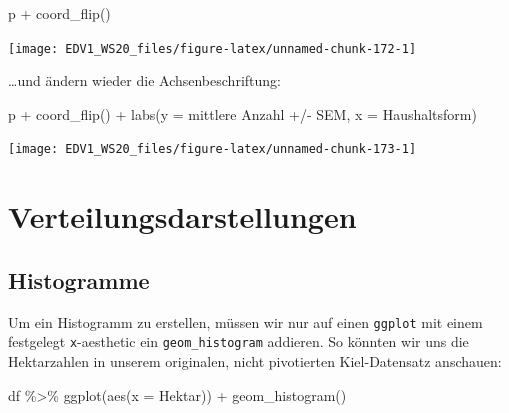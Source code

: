 \documentclass[
]{book}
\newenvironment{Shaded}{\begin{snugshade}}{\end{snugshade}}
\newcommand{\AttributeTok}[1]{\textcolor[rgb]{0.77,0.63,0.00}{#1}}
\newcommand{\FunctionTok}[1]{\textcolor[rgb]{0.00,0.00,0.00}{#1}}
\newcommand{\NormalTok}[1]{#1}
\newcommand{\SpecialCharTok}[1]{\textcolor[rgb]{0.00,0.00,0.00}{#1}}
\newcommand{\StringTok}[1]{\textcolor[rgb]{0.31,0.60,0.02}{#1}}
\begin{document}
\begin{Shaded}
\begin{Highlighting}[]
\NormalTok{p }\SpecialCharTok{+} \FunctionTok{coord\_flip}\NormalTok{()}
\end{Highlighting}
\end{Shaded}

\begin{center}\texttt{[image: EDV1\_WS20\_files/figure-latex/unnamed-chunk-172-1]} \end{center}

\ldots und ändern wieder die Achsenbeschriftung:

\begin{Shaded}
\begin{Highlighting}[]
\NormalTok{p }\SpecialCharTok{+} \FunctionTok{coord\_flip}\NormalTok{() }\SpecialCharTok{+}
  \FunctionTok{labs}\NormalTok{(}\AttributeTok{y =} \StringTok{\textquotesingle{}mittlere Anzahl +/{-} SEM\textquotesingle{}}\NormalTok{,}
       \AttributeTok{x =} \StringTok{\textquotesingle{}Haushaltsform\textquotesingle{}}\NormalTok{)}
\end{Highlighting}
\end{Shaded}

\begin{center}\texttt{[image: EDV1\_WS20\_files/figure-latex/unnamed-chunk-173-1]} \end{center}

\hypertarget{verteilungsdarstellungen}{%
\section{Verteilungsdarstellungen}\label{verteilungsdarstellungen}}

\hypertarget{histogramme}{%
\subsection{Histogramme}\label{histogramme}}

Um ein Histogramm zu erstellen, müssen wir nur auf einen \texttt{ggplot} mit einem festgelegt \texttt{x}-aesthetic ein \texttt{geom\_histogram} addieren. So könnten wir uns die Hektarzahlen in unserem originalen, nicht pivotierten Kiel-Datensatz anschauen:

\begin{Shaded}
\begin{Highlighting}[]
\NormalTok{df }\SpecialCharTok{\%\textgreater{}\%} 
  \FunctionTok{ggplot}\NormalTok{(}\FunctionTok{aes}\NormalTok{(}\AttributeTok{x =}\NormalTok{ Hektar)) }\SpecialCharTok{+}
  \FunctionTok{geom\_histogram}\NormalTok{()}
\end{Highlighting}
\end{Shaded}
\end{document}
